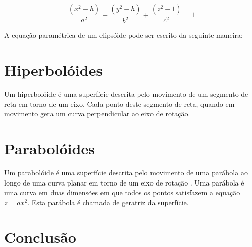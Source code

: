 \documentclass[
	article,			%
	11pt,				%
	oneside,			%
	a4paper,			%
	english,			%
	brazil,				%
	]{abntex2}
\begin{document}
			$$\frac{(x^2-h)}{a^2}+\frac{(y^2-h)}{b^2}+\frac{(z^2-1)}{c^2}=1$$

		A equação paramétrica de um elipsóide pode ser escrito da seguinte
		maneira:
		


	\section{Hiperbolóides} 

		Um hiperbolóide é uma superfície descrita pelo movimento de um segmento de
		reta em torno de um eixo. Cada ponto deste segmento de reta, quando em
		movimento gera um curva perpendicular ao eixo de rotação.

	\section{Parabolóides}

		Um parabolóide é uma superfície descrita pelo movimento de uma parábola ao
		longo de uma curva planar em torno de um eixo de rotação . Uma parábola é
		uma curva em duas dimensões em que todos os pontos satisfazem a equação $z =
		ax^2$. Esta parábola é chamada de geratriz da superfície.

	\section{Conclusão}
    
	

	\nocite{boulos1997}
	\nocite{winterle2000vetores}
	
\end{document}
